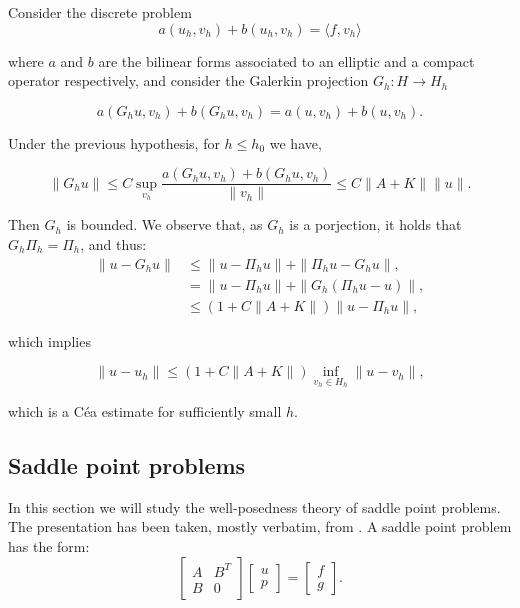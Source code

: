 \documentclass{article}
\begin{document}
Consider the discrete problem
\[a(u_h,v_h) + b(u_h,v_h) = \langle f, v_h\rangle\]

where $a$ and $b$ are the bilinear forms associated to an elliptic and a compact operator respectively, and consider the Galerkin projection $G_h: H\to H_h$

\[a(G_hu, v_h) + b(G_hu, v_h) = a(u, v_h) + b(u,v_h).\]

Under the previous hypothesis, for $h\leq h_0$ we have, 

\[\|G_hu\|\leq C\sup_{v_h}\frac{a(G_hu, v_h) + b(G_hu, v_h)}{\|v_h\|}\leq C\|A+K\|\|u\|.\]

Then $G_h$ is bounded. We observe that, as $G_h$ is a porjection, it holds that $G_h\Pi_h = \Pi_h$, and thus:
\begin{align*}
    \|u - G_hu\|&\leq \|u-\Pi_hu\| + \|\Pi_hu - G_hu\|,\\
    &= \|u-\Pi_hu\| + \|G_h(\Pi_hu - u)\|,\\
    &\leq (1+C\|A+K\|)\|u - \Pi_h u\|,
\end{align*}

which implies

\[\|u-u_h\|\leq (1+C\|A+K\|)\inf_{v_h\in H_h}\|u-v_h\|,\] 

which is a Céa estimate for sufficiently small $h$.

\subsection{Saddle point problems}

In this section we will study the well-posedness theory of saddle point problems. The presentation has been taken, mostly verbatim, from \cite{gatica2014simple}. A saddle point problem has the form:
\begin{displaymath}
    \begin{bmatrix}
        A & B^{T}\\ 
        B & 0
    \end{bmatrix}
    \begin{bmatrix}
        u \\ p
    \end{bmatrix}
    =
    \begin{bmatrix}
        f \\ g
    \end{bmatrix}.
\end{displaymath}
\end{document}
